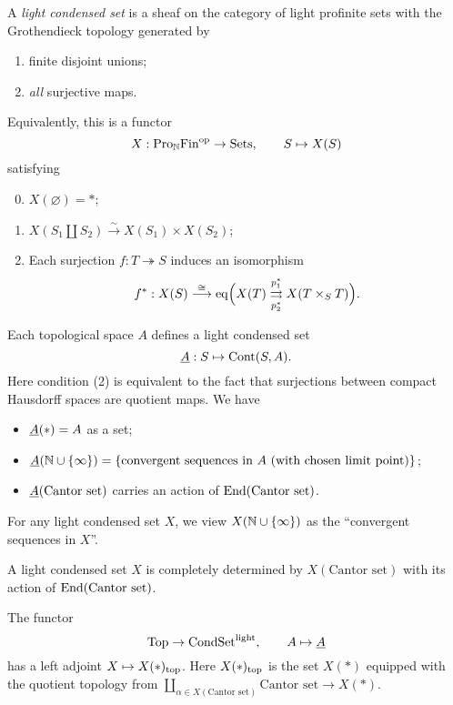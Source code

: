 \documentclass{notes}
\begin{document}
\begin{defi}
A {\em light condensed set} is a sheaf on the category of light
profinite sets with the Grothendieck topology generated by
\begin{enumerate}
\item finite disjoint unions;
\item {\em all} surjective maps.
\end{enumerate}
Equivalently, this is a functor 
$$
  X: \text{Pro}_{\mathbb{N}}\text{Fin}^{\rm op} \to \text{Sets},\qquad S\mapsto X(S)
$$
satisfying
\begin{enumerate}
\setcounter{enumi}{-1}
\item $X(\varnothing)=*$;
\item $X(S_1\amalg S_2)\stackrel{\sim}\longrightarrow X(S_1)\times X(S_2)$;
\item Each surjection $f:T\twoheadrightarrow S$ induces an isomorphism
$$
  f^*:X(S) \stackrel{\cong}\longrightarrow {\rm eq}\Bigl(X(T)
  \overset{p_1^*}{\underset{p_2^*}{\rightrightarrows}} X(T\times_ST)\Bigr).
$$
\end{enumerate}
\end{defi}

\begin{example}
Each topological space $A$ defines a light condensed set 
$$
  \underline{A}: S\mapsto{\rm Cont}(S,A).
$$
Here condition (2) is equivalent to the fact that surjections between
compact Hausdorff spaces are quotient maps. We have
\begin{itemize}
\item $\underline{A}(*) = A$ as a set; 
\item $\underline{A}({\mathbb{N}}\cup\{\infty\}) = \{\text{convergent sequences in $A$
  (with chosen limit point)}\}$;
\item $\underline{A}(\text{Cantor set})$ carries an action of
  $\mathrm{ End}(\text{Cantor set})$. 
\end{itemize}
\end{example}

For any light condensed set $X$, we view $X({\mathbb{N}}\cup\{\infty\})$ as the
``convergent sequences in $X$''. 

\begin{remark}
A light condensed set $X$ is completely determined by $X(\text{Cantor
  set})$ with its action of $\mathrm{ End}(\text{Cantor set})$.
\end{remark}

\begin{prop}
The functor
$$
  \text{Top} \to \text{CondSet}^{\rm light},\qquad A\mapsto\underline{A}
$$
has a left adjoint $X\mapsto X(*)_{\rm top}$. Here $X(*)_{\rm top}$ is
the set $X(*)$ equipped with the quotient topology from
$\coprod_{\alpha\in X(\text{Cantor set})}\text{Cantor set} \to X(*)$.
\end{prop}
\end{document}
